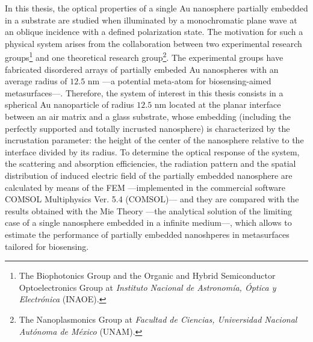 In this thesis, the optical properties of a single Au nanosphere partially embedded in a substrate are studied when illuminated by a monochromatic plane wave at an oblique incidence with a defined polarization state. The motivation for such a physical system arises from the collaboration between two experimental research groups\footnote{The Biophotonics Group and the Organic and Hybrid Semiconductor Optoelectronics Group at \textit{Instituto Nacional de Astronomía, Óptica y Electrónica} (INAOE).} and one theoretical research group\footnote{The Nanoplasmonics Group at \textit{Facultad de Ciencias, Universidad Nacional Autónoma de México} (UNAM).}. The experimental groups have fabricated disordered arrays of partially embeded Au nanospheres with an average radius of $12.5$ nm ---a potential meta-atom for biosensing-aimed metasurfaces---. Therefore, the system of interest in this thesis consists in a spherical Au nanoparticle of radius $12.5$ nm located at the planar interface between an air matrix and a glass substrate, whose embedding (including the perfectly supported and totally incrusted nanosphere) is characterized by the incrustation parameter: the height of the center of the nanosphere relative to the interface divided by its radius. To determine the optical response of the system, the scattering and absorption efficiencies, the radiation pattern and the spatial distribution of induced electric field of the partially embedded nanosphere are calculated by means of the FEM ---implemented in the commercial software COMSOL Multiphysics\texttrademark{} Ver. 5.4 (COMSOL)--- and they are compared with the results obtained with the Mie Theory ---the analytical solution of the limiting case of a single nanosphere embedded in a infinite medium---, which allows to estimate the performance of partially embedded nanoshperes in metasurfaces tailored for biosensing.

